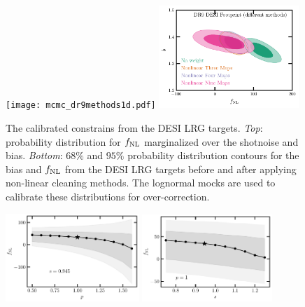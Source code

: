 \begin{figure}
    \raggedleft
    \texttt{[image: mcmc\_dr9methods1d.pdf]}
    \includegraphics[width=0.47\textwidth, trim={0 0 0.15cm 0.2cm},clip]{figures/mcmc_dr9methods.pdf} 
    \caption{The calibrated constrains from the DESI LRG targets. \textit{Top}: probability distribution for $f_{\rm NL}$ marginalized over the shotnoise and bias. \textit{Bottom}: $68\%$ and $95\%$ probability distribution contours for the bias and $f_{\rm NL}$ from the DESI LRG targets before and after applying non-linear cleaning methods. The lognormal mocks are used to calibrate these distributions for over-correction.}\label{fig:mcmc_dr9}
\end{figure}

\begin{figure}
\raggedleft
\includegraphics[width=0.45\textwidth]{figures/fnl_p.pdf}
\includegraphics[width=0.437\textwidth]{figures/fnl_magbias.pdf}
\caption{}\label{fig:fnl_magbias}
\end{figure}


